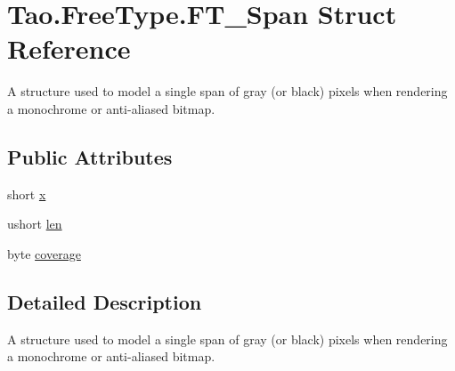 \hypertarget{struct_tao_1_1_free_type_1_1_f_t___span}{
\section{Tao.FreeType.FT\_\-Span Struct Reference}
\label{struct_tao_1_1_free_type_1_1_f_t___span}
}


A structure used to model a single span of gray (or black) pixels when rendering a monochrome or anti-\/aliased bitmap.  


\subsection*{Public Attributes}
\begin{DoxyCompactItemize}
\item 
short \hyperlink{struct_tao_1_1_free_type_1_1_f_t___span_a791ebf79ab6ce3adb0dfda778e43d095}{x}
\item 
ushort \hyperlink{struct_tao_1_1_free_type_1_1_f_t___span_afb3b3f463b12a452683982fae4b316ef}{len}
\item 
byte \hyperlink{struct_tao_1_1_free_type_1_1_f_t___span_abda38ed9c10f028765e36dbd1c6d94cb}{coverage}
\end{DoxyCompactItemize}


\subsection{Detailed Description}
A structure used to model a single span of gray (or black) pixels when rendering a monochrome or anti-\/aliased bitmap. 

